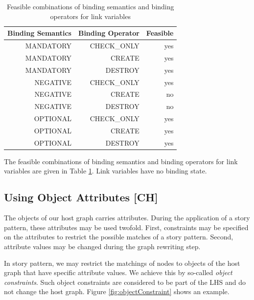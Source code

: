 

\begin{table}[htbp]
  \centering
  \caption{Feasible combinations of binding semantics and
  binding operators for link variables}
    \begin{tabular}{|r|r|r|}
    \hline
    \textbf{Binding Semantics} & \textbf{Binding
    Operator} & \textbf{Feasible} \\
    \hline
    MANDATORY & CHECK\_ONLY & yes \\
    MANDATORY & CREATE & yes \\
    MANDATORY & DESTROY & yes \\
    NEGATIVE & CHECK\_ONLY & yes \\
    NEGATIVE & CREATE & no \\
    NEGATIVE & DESTROY & no \\
    OPTIONAL & CHECK\_ONLY & yes \\
    OPTIONAL & CREATE & yes \\
    OPTIONAL & DESTROY & yes \\
    \hline
    \end{tabular}%
  \label{tab:bindingCombinations_links}%
\end{table}%

The feasible combinations of binding semantics and binding operators for link
variables are given in Table \ref{tab:bindingCombinations_links}. Link variables
have no binding state.

\subsection{Using Object Attributes [CH]}
\label{sec:StoryPatterns:attributes}

The objects of our host graph carries attributes. During the application of a story pattern, these attributes may be used twofold. First, constraints may be specified on the attributes to restrict the possible matches of a story pattern. Second, attribute values may be changed during the graph rewriting step.

In story pattern, we may restrict the matchings of nodes to objects of the host graph that have specific attribute values. We achieve this by so-called \emph{object constraints}. Such object constraints are considered to be part of the LHS and do not change the host graph. Figure \ref{fig:objectConstraint} shows an example.

